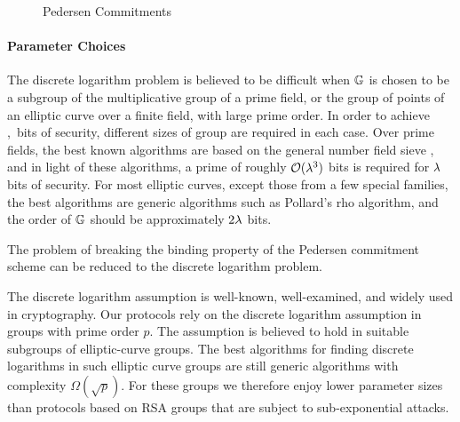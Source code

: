 \begin{figure}[t]
  \caption{Pedersen Commitments}
\label{alg:com:pedersen}
\end{figure}

\paragraph{Parameter Choices} The discrete logarithm problem is believed to be difficult when $\mathbb{G}$ is chosen to be a subgroup of the multiplicative group of a prime field, or the group of points of an elliptic curve over a finite field, with large prime order. In order to achieve \sep\ bits of security, different sizes of group are required in each case. Over prime fields, the best known algorithms are based on the general number field sieve \cite{schiro}, and in light of these algorithms, a prime of roughly $\mathcal{O}(\lambda^3)$ bits is required for $\lambda$ bits of security. For most elliptic curves, except those from a few special families, the best algorithms are generic algorithms such as Pollard's rho algorithm, and the order of $\mathbb{G}$ should be approximately $2\lambda$ bits.

The problem of breaking the binding property of the Pedersen commitment scheme can be reduced to the discrete logarithm problem.

The discrete logarithm assumption is well-known, well-examined, and widely used in cryptography. Our protocols rely on the discrete logarithm assumption in groups with prime order $p$. The assumption is believed to hold in suitable subgroups of elliptic-curve groups. The best algorithms for finding discrete logarithms in such elliptic curve groups are still generic algorithms with complexity $\Omega (\sqrt{p})$. For these groups we therefore enjoy lower parameter sizes than protocols based on RSA groups that are subject to sub-exponential attacks.

